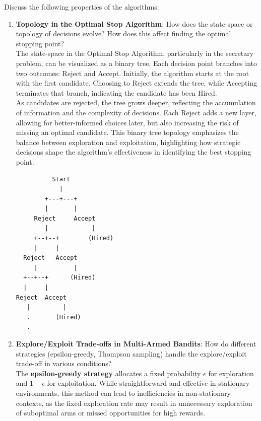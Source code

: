 \documentclass[12pt]{exam}
\begin{document}
\begin{questions}
Discuss the following properties of the algorithms:

\begin{enumerate}
    \item \textbf{Topology in the Optimal Stop Algorithm}: How does the state-space or topology of decisions evolve? How does this affect finding the optimal stopping point?\\

    The state-space in the Optimal Stop Algorithm, particularly in the secretary problem, can be visualized as a binary tree. Each decision point branches into two outcomes: Reject and Accept. Initially, the algorithm starts at the root with the first candidate. Choosing to Reject extends the tree, while Accepting terminates that branch, indicating the candidate has been Hired. \\

    As candidates are rejected, the tree grows deeper, reflecting the accumulation of information and the complexity of decisions. Each Reject adds a new layer, allowing for better-informed choices later, but also increasing the risk of missing an optimal candidate. This binary tree topology emphasizes the balance between exploration and exploitation, highlighting how strategic decisions shape the algorithm's effectiveness in identifying the best stopping point. \\
    
    \begin{lstlisting}
          Start
            |
        +---+---+
        |       |
     Reject     Accept
        |            |
     +--+--+        (Hired)
     |     |        
  Reject   Accept   
     |          |
  +--+--+      (Hired)
  |     |       
Reject  Accept  
   |         | 
   .       (Hired)
   .    
    \end{lstlisting}

    
    \item \textbf{Explore/Exploit Trade-offs in Multi-Armed Bandits}: How do different strategies (epsilon-greedy, Thompson sampling) handle the explore/exploit trade-off in various conditions?\\
    
    The \textbf{epsilon-greedy strategy} allocates a fixed probability \( \epsilon \) for exploration and \( 1 - \epsilon \) for exploitation. While straightforward and effective in stationary environments, this method can lead to inefficiencies in non-stationary contexts, as the fixed exploration rate may result in unnecessary exploration of suboptimal arms or missed opportunities for high rewards.\\
    

\end{enumerate}
\end{questions}
\end{document}
